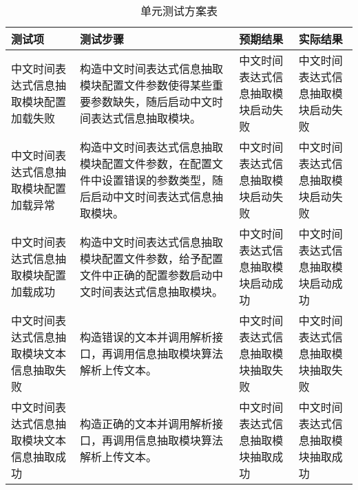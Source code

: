 \begin{table}[b]
    \centering
    \caption{单元测试方案表}
    \begin{tabularx}{\linewidth}{|Y|Y|Y|Y|}
        \hline
        测试项                                     & 测试步骤                                                                                                         & 预期结果                           & 实际结果                           \\
        \hline
        中文时间表达式信息抽取模块配置加载失败     & 构造中文时间表达式信息抽取模块配置文件参数使得某些重要参数缺失，随后启动中文时间表达式信息抽取模块。             & 中文时间表达式信息抽取模块启动失败 & 中文时间表达式信息抽取模块启动失败 \\
        \hline
        中文时间表达式信息抽取模块配置加载异常     & 构造中文时间表达式信息抽取模块配置文件参数，在配置文件中设置错误的参数类型，随后启动中文时间表达式信息抽取模块。 & 中文时间表达式信息抽取模块启动失败 & 中文时间表达式信息抽取模块启动失败 \\
        \hline
        中文时间表达式信息抽取模块配置加载成功     & 构造中文时间表达式信息抽取模块配置文件参数，给予配置文件中正确的配置参数启动中文时间表达式信息抽取模块。         & 中文时间表达式信息抽取模块启动成功 & 中文时间表达式信息抽取模块启动成功 \\
        \hline
        中文时间表达式信息抽取模块文本信息抽取失败 & 构造错误的文本并调用解析接口，再调用信息抽取模块算法解析上传文本。                                               & 中文时间表达式信息抽取模块抽取失败 & 中文时间表达式信息抽取模块抽取失败 \\
        \hline
        中文时间表达式信息抽取模块文本信息抽取成功 & 构造正确的文本并调用解析接口，再调用信息抽取模块算法解析上传文本。                                               & 中文时间表达式信息抽取模块抽取成功 & 中文时间表达式信息抽取模块抽取成功 \\
        \hline
    \end{tabularx}
    \label{tab:unit_test1}
\end{table}


